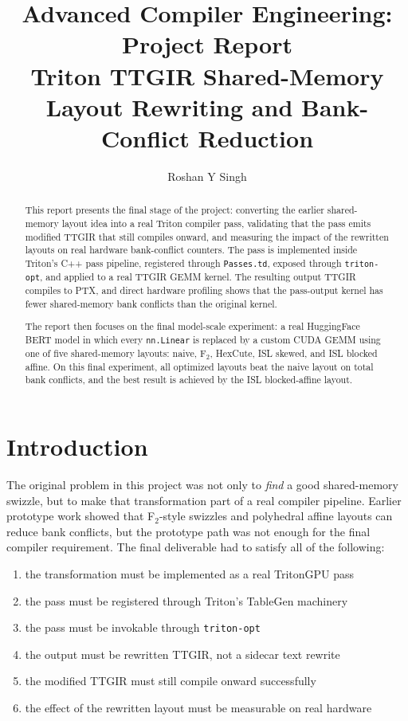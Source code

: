 \documentclass[11pt,a4paper]{article}
\title{Advanced Compiler Engineering: Project Report\\
Triton TTGIR Shared-Memory Layout Rewriting and Bank-Conflict Reduction}
\author{Roshan Y Singh}
\date{}
\begin{document}
\maketitle

\begin{abstract}
This report presents the final stage of the project: converting the earlier
shared-memory layout idea into a real Triton compiler pass, validating that the
pass emits modified TTGIR that still compiles onward, and measuring the impact
of the rewritten layouts on real hardware bank-conflict counters.  The pass is
implemented inside Triton's C++ pass pipeline, registered through
\texttt{Passes.td}, exposed through \texttt{triton-opt}, and applied to a real
TTGIR GEMM kernel.  The resulting output TTGIR compiles to PTX, and direct
hardware profiling shows that the pass-output kernel has fewer shared-memory
bank conflicts than the original kernel.

The report then focuses on the final model-scale experiment: a real
HuggingFace BERT model in which every \texttt{nn.Linear} is replaced by a
custom CUDA GEMM using one of five shared-memory layouts: naive, F$_2$,
HexCute, ISL skewed, and ISL blocked affine.  On this final experiment, all
optimized layouts beat the naive layout on total bank conflicts, and the best
result is achieved by the ISL blocked-affine layout.
\end{abstract}

\tableofcontents
\newpage

\section{Introduction}

The original problem in this project was not only to \emph{find} a good
shared-memory swizzle, but to make that transformation part of a real compiler
pipeline.  Earlier prototype work showed that F$_2$-style swizzles and
polyhedral affine layouts can reduce bank conflicts, but the prototype path
was not enough for the final compiler requirement.  The final deliverable had
to satisfy all of the following:

\begin{enumerate}
\item the transformation must be implemented as a real TritonGPU pass
\item the pass must be registered through Triton's TableGen machinery
\item the pass must be invokable through \texttt{triton-opt}
\item the output must be rewritten TTGIR, not a sidecar text rewrite
\item the modified TTGIR must still compile onward successfully
\item the effect of the rewritten layout must be measurable on real hardware
\end{enumerate}
\end{document}
